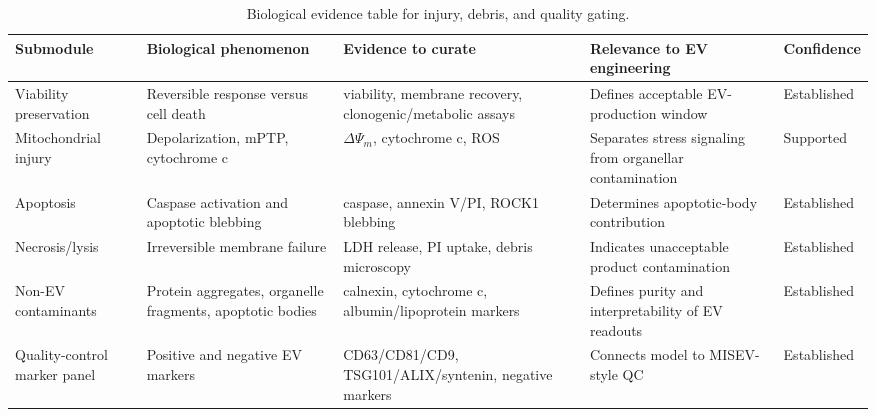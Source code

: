 \begin{table}[t]
\footnotesize\sf
\centering
\caption{Biological evidence table for injury, debris, and quality gating.\label{T_A13_bio_quality_gate}}
\begin{tabular}{p{2.7cm} p{3.4cm} p{4.2cm} p{3.0cm} p{2.0cm}}
\toprule
\textbf{Submodule} & \textbf{Biological phenomenon} & \textbf{Evidence to curate} & \textbf{Relevance to EV engineering} & \textbf{Confidence} \\
\midrule
Viability preservation & Reversible response versus cell death & viability, membrane recovery, clonogenic/metabolic assays & Defines acceptable EV-production window & Established \cite{pakhomova2013two,beebe2012transient,bhattacharya2022calcium} \\
Mitochondrial injury & Depolarization, mPTP, cytochrome c & $\Delta\Psi_m$, cytochrome c, ROS & Separates stress signaling from organellar contamination & Supported \cite{beebe2012transient,napotnik2012mitochondrial,pakhomova2012oxidative} \\
Apoptosis & Caspase activation and apoptotic blebbing & caspase, annexin V/PI, ROCK1 blebbing & Determines apoptotic-body contribution & Established \cite{pakhomova2013two,teixeira2020rock1,cappe2023systematic} \\
Necrosis/lysis & Irreversible membrane failure & LDH release, PI uptake, debris microscopy & Indicates unacceptable product contamination & Established \cite{pakhomova2013two,cappe2023systematic} \\
Non-EV contaminants & Protein aggregates, organelle fragments, apoptotic bodies & calnexin, cytochrome c, albumin/lipoprotein markers & Defines purity and interpretability of EV readouts & Established \cite{webber2013pure,brennan2020comparison,cappe2023systematic,welsh2024minimal} \\
Quality-control marker panel & Positive and negative EV markers & CD63/CD81/CD9, TSG101/ALIX/syntenin, negative markers & Connects model to MISEV-style QC & Established \cite{welsh2024minimal,jeppesen2019reassessment,kugeratski2021quantitative} \\
\bottomrule
\end{tabular}
\end{table}

